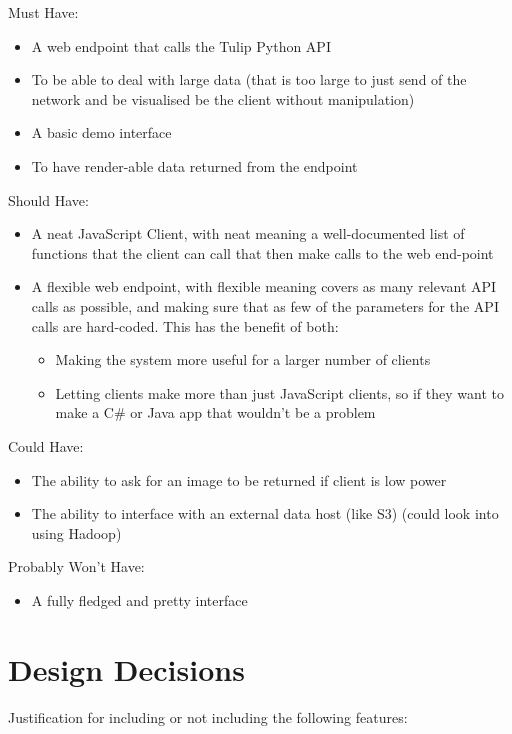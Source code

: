 \documentclass[../dissertation.tex]{subfiles}
\begin{document}
Must Have:
\begin{itemize}
    \item A web endpoint that calls the Tulip Python API
	\item To be able to deal with large data (that is too large to just send of the network and be visualised be the client without manipulation)
	\item A basic demo interface
	\item To have render-able data returned from the endpoint
\end{itemize}

Should Have:
\begin{itemize}
    \item A neat JavaScript Client, with neat meaning a well-documented list of functions that the client can call that then make calls to the web end-point
	\item A flexible web endpoint, with flexible meaning covers as many relevant API calls as possible, and making sure that as few of the parameters for the API calls are hard-coded. This has the benefit of both:
	\begin{itemize}
	    \item Making the system more useful for a larger number of clients
        \item Letting clients make more than just JavaScript clients, so if they want to make a C\# or Java app that wouldn't be a problem
	\end{itemize}
\end{itemize}
	
Could Have:
\begin{itemize}
    \item The ability to ask for an image to be returned if client is low power
	\item The ability to interface with an external data host (like S3) (could look into using Hadoop)
\end{itemize}
	
Probably Won't Have:
\begin{itemize}
    \item A fully fledged and pretty interface
\end{itemize}
	

\section{Design Decisions}

Justification for including or not including the following features:
\end{document}
